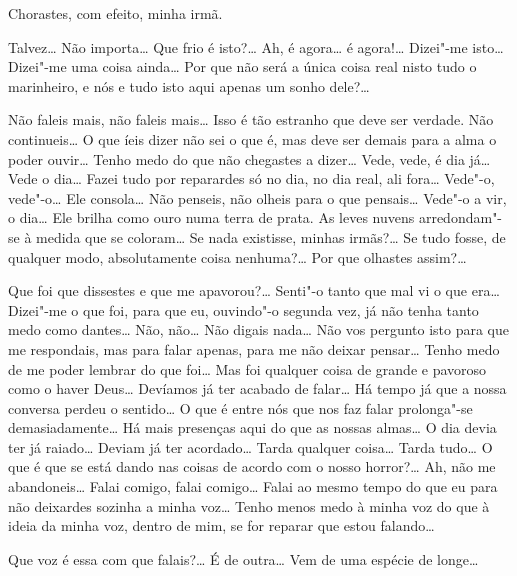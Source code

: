  Chorastes, com efeito, minha irmã.

 Talvez\ldots{} Não importa\ldots{} 
Que frio é isto?\ldots{} Ah, é agora\ldots{} é
agora!\ldots{} Dizei"-me isto\ldots{} 
Dizei"-me uma coisa ainda\ldots{} Por que não
será a única coisa real nisto tudo o marinheiro, 
e nós e tudo isto aqui apenas um sonho dele?\ldots{} 

 Não faleis mais, não faleis mais\ldots{} 
Isso é tão estranho que deve ser verdade. Não continueis\ldots{} 
O que íeis dizer não sei o que é,
mas deve ser demais para a alma o poder ouvir\ldots{}
Tenho medo do que não chegastes a dizer\ldots{} 
Vede, vede, é dia já\ldots{} Vede o dia\ldots{} 
Fazei tudo por reparardes só no dia, no dia real,
ali fora\ldots{} Vede"-o, vede"-o\ldots{}
Ele consola\ldots{} Não penseis, não olheis para 
o que pensais\ldots{} Vede"-o a vir, o dia\ldots{} 
Ele brilha como ouro numa terra de prata. As leves nuvens
arredondam"-se à medida que se coloram\ldots{}
Se nada existisse, minhas irmãs?\ldots{} 
Se tudo fosse, de qualquer modo, absolutamente coisa nenhuma?\ldots{}
Por que olhastes assim?\ldots{}


 Que foi que dissestes e que me apavorou?\ldots{} 
Senti"-o tanto que mal vi o que era\ldots{} Dizei"-me o que
foi, para que eu, ouvindo"-o segunda vez, já não tenha tanto
medo como dantes\ldots{} Não, não\ldots{} Não digais nada\ldots{} 
Não vos pergunto isto para que me respondais, mas para
falar apenas, para me não deixar pensar\ldots{} Tenho medo 
de me poder lembrar do que foi\ldots{} Mas foi qualquer 
coisa de grande e pavoroso como o haver Deus\ldots{} 
Devíamos já ter acabado de falar\ldots{} Há tempo já que a
nossa conversa perdeu o sentido\ldots{} O que é entre nós
que nos faz falar prolonga"-se demasiadamente\ldots{} 
Há mais presenças aqui do que as nossas almas\ldots{}
O dia devia ter já raiado\ldots{} Deviam já ter
acordado\ldots{} Tarda qualquer coisa\ldots{} Tarda 
tudo\ldots{} O que é que se está dando nas coisas de
acordo com o nosso horror?\ldots{} Ah, não me 
abandoneis\ldots{} Falai comigo, falai comigo\ldots{} 
Falai ao mesmo tempo do que eu para não deixardes
sozinha a minha voz\ldots{} Tenho menos medo à minha 
voz do que à ideia da minha voz, dentro de mim, se for 
reparar que estou falando\ldots{}

 Que voz é essa com que falais?\ldots{}
É de outra\ldots{} Vem de uma espécie de longe\ldots{}

